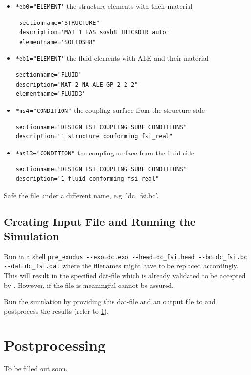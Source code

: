 \begin{itemize}
 \item \verb|*eb0="ELEMENT"| \qquad the structure elements with their material
 \begin{small} \begin{verbatim}
 sectionname="STRUCTURE"
 description="MAT 1 EAS sosh8 THICKDIR auto"
 elementname="SOLIDSH8"
 \end{verbatim} \end{small}
 \item \verb|*eb1="ELEMENT"| \qquad the fluid elements with ALE and their material
 \begin{small} \begin{verbatim}
sectionname="FLUID"
description="MAT 2 NA ALE GP 2 2 2"
elementname="FLUID3"
\end{verbatim} \end{small}
\item \verb|*ns4="CONDITION"|  \qquad the coupling surface from the structure side
\begin{small} \begin{verbatim}
sectionname="DESIGN FSI COUPLING SURF CONDITIONS"
description="1 structure conforming fsi_real"
 \end{verbatim} \end{small}
\item \verb|*ns13="CONDITION"| \qquad the coupling surface from the fluid side
\begin{small} \begin{verbatim}
sectionname="DESIGN FSI COUPLING SURF CONDITIONS"
description="1 fluid conforming fsi_real"
 \end{verbatim} \end{small}
\end{itemize}
Safe the file under a different name, e.g. 'dc\_fsi.bc'.

\subsection{Creating \baci{} Input File and Running the Simulation}
Run in a shell \verb|pre_exodus --exo=dc.exo --head=dc_fsi.head --bc=dc_fsi.bc --dat=dc_fsi.dat| where the filenames might have to be replaced accordingly. This will result in the specified dat-file which is already validated to be accepted by \baci{}. However, if the file is meaningful cannot be assured.

Run the simulation by providing this dat-file and an output file to \baci{} and postprocess the results (refer to \ref{tut_fsi_preexo:postprocess}).

\section{Postprocessing}
\label{tut_fsi_preexo:postprocess}
To be filled out soon.